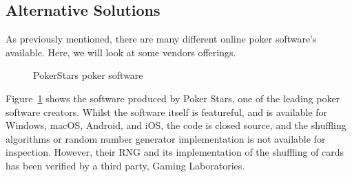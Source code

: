 \subsection{Alternative Solutions}

As previously mentioned, there are many different online poker software's
available. Here, we will look at some vendors offerings.

\begin{figure}[H]
    \caption{PokerStars poker software}%
    \label{fig:pokerstars}
\end{figure}

Figure~\ref{fig:pokerstars} shows the software produced by Poker Stars, one
of the leading poker software creators. Whilst the software itself is
featureful, and is available for Windows, macOS, Android, and iOS, the code
is closed source, and the shuffling algorithms or random number generator
implementation is not available for inspection. However, their RNG and its
implementation of the shuffling of cards has been verified by a third party,
Gaming Laboratories. \parencite{website:gaminglabs2015}

